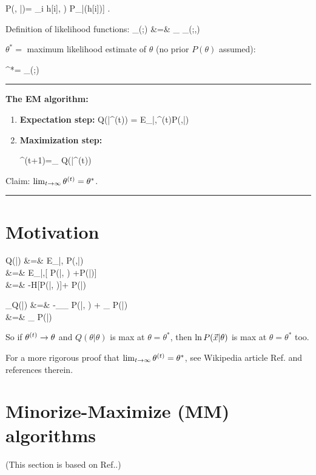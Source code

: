 \beq
P(\vecx, \vech|\theta)=
\prod_i \left[P_{\rvx|\rvh,\ul{\theta}}
(x[i]\cond h[i], \theta)
P_{\rvh|\ul{\theta}}(h[i]\cond \theta)\right]
\;.
\eeq

Definition of likelihood functions:
\beqa
{}
_{\call(\theta;\vecx)}
&=&
\sum_{\vech}
_{\call(\theta;\vecx,\vech)}
\eeqa


$\theta^*=$ maximum likelihood
estimate of $\theta$ (no prior $P(\theta)$
assumed):

\beq
\theta^*=
\argmax_\theta\call(\theta;\vecx)
\eeq

\hrule\noindent
{\bf The EM algorithm:}
\begin{enumerate}
\item{\bf Expectation step:} 
\beq
Q(\theta|\theta^{(t)})
=
E_{\vech|\vecx,\theta^{(t)}}\ln P(\vecx,\vech|\theta)
\eeq

\item{\bf Maximization step:}

\beq
\theta^{(t+1)}=\argmax_\theta
Q(\theta|\theta^{(t)})
\eeq
\end{enumerate}
Claim: $\lim_{t\rightarrow \infty}
\theta^{(t)}=\theta^*$.

\;
\hrule
\section*{Motivation}

\beqa
Q(\theta|\theta)
&=&
E_{\vech|\vecx,\theta}
\ln P(\vecx,\vech|\theta)
\\
&=&
E_{\vech|\vecx,\theta}[
\ln P(\vech|\vecx, \theta) 
+\ln P(\vecx|\theta)]
\\
&=&
-H[P(\ul{\vech}|\vecx, \theta)]+
\ln P(\vecx|\theta)
\eeqa

\beqa
\partial_\theta Q(\theta|\theta)
&=&
-\sum_{\vech}\partial_\theta
P(\ul{\vech}|\vecx, \theta)
+
\partial_\theta
\ln P(\vecx|\theta)
\\
&=&
\partial_\theta
\ln P(\vecx|\theta)
\eeqa

So if $\theta^{(t)}\rightarrow \theta$
and $Q(\theta|\theta)$ is max at $\theta=\theta^*$,
then $\ln P({\vec{x}}|\theta)$
is max at $\theta=\theta^*$ too.

For a  more rigorous proof
that $\lim_{t\rightarrow \infty}\theta^{(t)}
=\theta^*$,
see Wikipedia article Ref.\cite{wiki-em}
and references therein.

\section*{Minorize-Maximize (MM) algorithms}
(This  section is based on 
Ref.\cite{emory-biostat}.)

